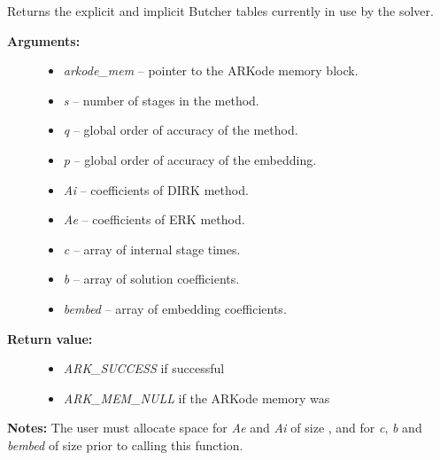 \documentclass[letterpaper,10pt,english]{sphinxmanual}
\begin{document}
\begin{fulllineitems}
\label{c_interface/User_callable:c.ARKodeGetCurrentButcherTables}
Returns the explicit and implicit Butcher tables
currently in use by the solver.
\begin{description}
\item[{\textbf{Arguments:}}] \leavevmode\begin{itemize}
\item {} 
\emph{arkode\_mem} -- pointer to the ARKode memory block.

\item {} 
\emph{s} -- number of stages in the method.

\item {} 
\emph{q} -- global order of accuracy of the method.

\item {} 
\emph{p} -- global order of accuracy of the embedding.

\item {} 
\emph{Ai} -- coefficients of DIRK method.

\item {} 
\emph{Ae} -- coefficients of ERK method.

\item {} 
\emph{c} -- array of internal stage times.

\item {} 
\emph{b} -- array of solution coefficients.

\item {} 
\emph{bembed} -- array of embedding coefficients.

\end{itemize}

\item[{\textbf{Return value:}}] \leavevmode\begin{itemize}
\item {} 
\emph{ARK\_SUCCESS} if successful

\item {} 
\emph{ARK\_MEM\_NULL} if the ARKode memory was 

\end{itemize}

\end{description}

\textbf{Notes:}  The user must allocate space for \emph{Ae} and \emph{Ai} of size
, and for \emph{c}, \emph{b} and \emph{bembed} of size
 prior to calling this function.

\end{fulllineitems}
\end{document}
